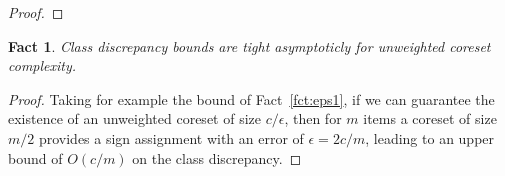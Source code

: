 \documentclass[12pt]{colt2019} %
\newtheorem{fact}[theorem]{Fact}
\newcommand{\add}[1]{\textcolor{blue}{ADD: #1}}
\newcommand{\eps}{\epsilon}
\begin{document}
\begin{proof}
%
%
\end{proof}

\begin{fact}
Class discrepancy bounds are tight asymptoticly for {\it unweighted} coreset complexity.
\end{fact}
\begin{proof}Taking for example the bound of Fact~\ref{fct:eps1}, if we can guarantee the existence of an unweighted coreset of size $c/\eps$, then for $m$ items a coreset of size $m/2$ provides a sign assignment with an error of $\eps=2c/m$, leading to an upper bound of $O(c/m)$ on the class discrepancy.
\end{proof}
\end{document}
